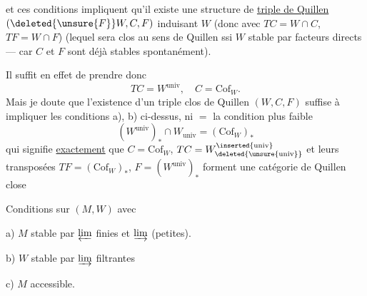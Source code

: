 et ces conditions impliquent  qu'il existe
une structure de \uline{triple  de Quillen}
$(\deleted{\unsure{F}}W,C,F)$ induisant $W$ (donc avec
$TC=W\cap C$, $TF=W\cap F$) (lequel sera clos au
sens de Quillen ssi $W$ stable par
facteurs directs --- car $C$ et $F$ sont déjà
stables spontanément).

Il suffit en effet de prendre donc
\[
 TC=W^{\mathrm{univ}},\quad C=\mathrm{Cof}_W.
\]
Mais je doute que \unsure{-} l'existence d'un
triple clos de Quillen $(W,C,F)$ suffise
à impliquer les conditions a), b)
ci-dessus, ni $=$ la condition plus faible
\[
 (W^{\mathrm{univ}})_*\cap W_{\mathrm{univ}}=(\mathrm{Cof}_W)_*
\]
qui  signifie \uline{exactement} que
$C=\mathrm{Cof}_W$, $TC=W_{\deleted{\unsure{\mathrm{univ}}}}^{\inserted{\mathrm{univ}}}$ et leurs transposées
$TF=(\mathrm{Cof}_W)_*$, $F=(W^{\mathrm{univ}})_*$ forment une  catégorie
de Quillen close

Conditions sur $(M,W)$ avec 

 a) $M$ stable par $\varprojlim$ finies et $\varinjlim$ (petites).

b) $W$  stable par $\varinjlim$ filtrantes

c) $M$ accessible.

